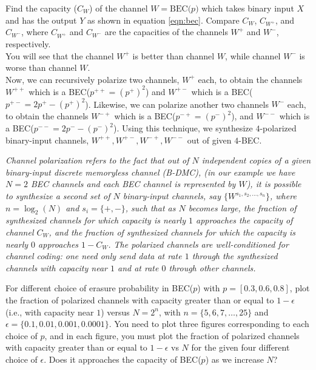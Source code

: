 \documentclass[a4paper,11pt]{article}
\begin{document}

{\color{blue}
Find the capacity ($C_W$) of the channel $W = \text{BEC($p$)}$ which takes binary input $X$ and has the output $Y$ as shown in equation \ref{eqn:bec}. Compare $C_W$, $C_{W^+}$, and $C_{W^-}$, where $C_{W^+}$ and $C_{W^-}$ are the capacities of the channels $W^+$ and $W^-$, respectively.\\
\noindent You will see that the channel $W^+$ is better than channel $W$, while channel $W^-$ is worse than channel $W$.
}
\\

Now, we can recursively polarize two channels, $W^+$ each, to obtain the channels $W^{++}$ which is a BEC($p^{++} = (p^{+})^2$) and $W^{+-}$ which is a BEC($p^{+-} = 2p^{+} - (p^{+})^2$).
Likewise, we can polarize another two channels $W^-$ each, to obtain the channels $W^{-+}$ which is a BEC($p^{-+} = (p^{-})^2$), and $W^{--}$ which is a BEC($p^{--} = 2p^- - (p^-)^2$). Using this technique, we synthesize $4$-polarized binary-input channels, $W^{++},W^{+-},W^{-+},W^{--}$ out of given $4$-BEC.

\textit{Channel polarization refers to the fact that out of $N$ independent copies of a given binary-input discrete memoryless channel (B-DMC), (in our example we have $N=2$ BEC channels and each BEC channel is represented by $W$), it is possible to synthesize a second set of $N$ binary-input channels, say $\{W^{s_1,s_2,\dots,s_n}\}$, where $n=\log_2(N)$ and $s_i = \{+,-\}$, such that as $N$ becomes large, the fraction of synthesized channels for which capacity is nearly $1$ approaches the capacity of channel $C_W$, and the fraction of synthesized channels for which the capacity is nearly $0$ approaches $1-C_W$. The polarized channels are well-conditioned for channel coding: one need only send data at rate $1$ through the synthesized channels with capacity near $1$ and at rate $0$ through other channels.\cite{arikan}}

{\color{blue}
For different choice of erasure probability in BEC($p$) with $p=[0.3,0.6,0.8]$, plot the fraction of polarized channels with capacity greater than or equal to $1-\epsilon$ (i.e., with capacity near $1$) versus $N=2^n$, with $n=\{5,6,7,\dots,25\}$ and $\epsilon = \{0.1,0.01,0.001,0.0001\}$. You need to plot three figures corresponding to each choice of $p$, and in each figure, you must plot the fraction of polarized channels with capacity greater than or equal to $1-\epsilon$ vs $N$ for the given four different choice of $\epsilon$. Does it approaches the capacity of BEC($p$) as we increase $N$? 
}
\end{document}
